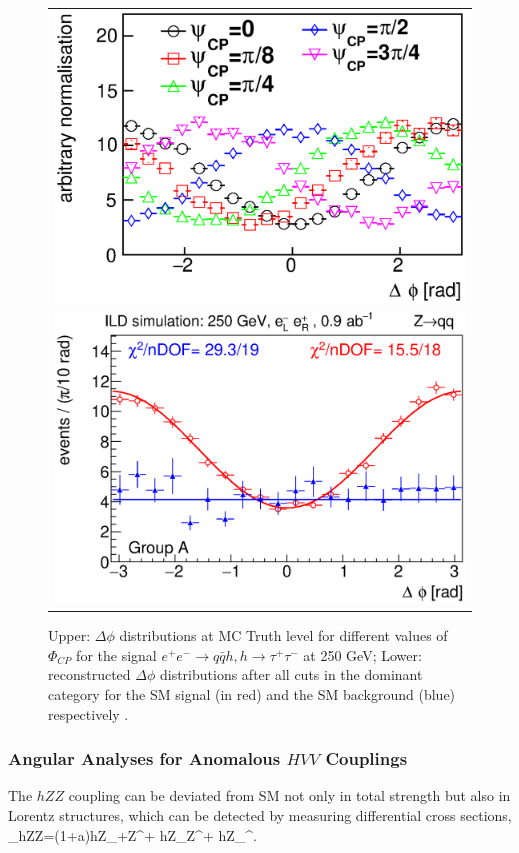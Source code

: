 \begin{figure}
\begin{tabular}[c]{c}
\includegraphics[width=0.85\hsize]{chapters/figures/ZH_qqtautau250_CP1.eps} \\
\includegraphics[width=0.85\hsize]{chapters/figures/ZH_qqtautau250_CP2.eps}
\end{tabular}
  \caption{Upper: $\Delta\phi$ distributions at MC Truth level for different 
  values of $\Phi_{CP}$ for the signal $e^+e^-\to q\bar{q} h, h\to\tau^+\tau^-$ at 250 GeV;
  Lower: reconstructed $\Delta\phi$ distributions after all cuts in the dominant category
  for the SM signal (in red) and the SM background (blue) respectively \cite{Jeans:2018anq}.}
  \label{fig:qqHtautauCP}
\end{figure}


\subsubsection{Angular Analyses for Anomalous $HVV$ Couplings}
The $hZZ$ coupling can be deviated from SM not only in total strength but also
in Lorentz structures, which can be detected by measuring differential cross sections,
\beq
{}_{hZZ}=(1+a)hZ_\mu+Z^\mu+
hZ_{\mu\nu}{Z}^{\mu\nu}+
hZ_{\mu\nu}^{\mu\nu}.


